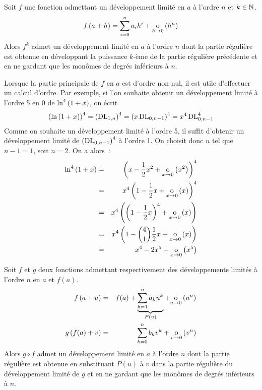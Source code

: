 \documentclass{magnolia}
\begin{document}
\begin{proposition}[utile=-3]
Soit $f$ une fonction admettant un développement limité en $a$ à
l'ordre $n$ et $k\in\mathbb{N}$.
\[f\left(a+h\right)=\sum_{i=0}^n a_i h^i+\underset{h \rightarrow 0}{\text{o}}\left(h^n\right)\]
Alors $f^k$ admet un développement limité en $a$ à l'ordre $n$ dont
la partie régulière est obtenue en développant la puissance $k$-ème de la partie
régulière précédente et en ne gardant que les monômes de degrés inférieurs à
$n$.
\end{proposition}

\begin{remarqueUnique}
\item Lorsque la partie principale de $f$ en $a$ est d'ordre non nul, il est
  utile d'effectuer un calcul d'ordre. Par exemple, si
  l'on souhaite obtenir un développement limité à l'ordre 5 en 0 de
  $\ln^4\left(1+x\right)$, on écrit
  \[\left(\ln\left(1+x\right)\right)^4=\left(\operatorname{DL}_{1,n}\right)^4=\left(x\operatorname{DL}_{0,n-1}\right)^4=x^4\operatorname{DL}_{0,n-1}^4\]
  Comme on souhaite un développement limité à l'ordre 5, il suffit
  d'obtenir un développement limité de $\left(\operatorname{DL}_{0,n-1}\right)^4$ à l'ordre 1.
  On choisit donc $n$ tel que $n-1=1$, soit $n=2$. On a alors~:
  \begin{eqnarray*}
  \ln^4\left(1+x\right)
  &=& \left(x-\frac{1}{2}x^2+\underset{x \rightarrow 0}{\text{o}}\left(x^2\right)\right)^4\\
  &=& x^4\left(1-\frac{1}{2}x+\underset{x \rightarrow 0}{\text{o}}\left(x\right)\right)^4\\
  &=& x^4\left(\left(1-\frac{1}{2}x\right)^4+\underset{x \rightarrow 0}{\text{o}}\left(x\right)\right)\\
  &=& x^4\left(1-\binom{4}{1}\frac{1}{2}x+\underset{x \rightarrow 0}{\text{o}}\left(x\right)\right)\\
  &=& x^4-2x^5+\underset{x \rightarrow 0}{\text{o}}\left(x^5\right)
  \end{eqnarray*}   
\end{remarqueUnique}

\begin{proposition}[utile=-3]
Soit $f$ et $g$ deux fonctions admettant respectivement des développements
limités à l'ordre $n$ en $a$ et $f(a)$.
\begin{eqnarray*}
f\left(a+u\right)&=&f(a)+\underbrace{\sum_{k=1}^n a_k u^k}_{P(u)}+\underset{u \rightarrow 0}{\text{o}}\left(u^n\right)\\
g\left(f(a)+v\right)&=&\sum_{k=0}^n b_k v^k+\underset{v \rightarrow 0}{\text{o}}\left(v^n\right)
\end{eqnarray*}
Alors $g\circ f$ admet un développement limité en $a$ à l'ordre $n$
dont la partie régulière est obtenue en substituant $P(u)$ à $v$ dans la partie
régulière du développement limité de $g$ et en ne gardant que les monômes de
degrés inférieurs à $n$.
\end{proposition}
\end{document}
